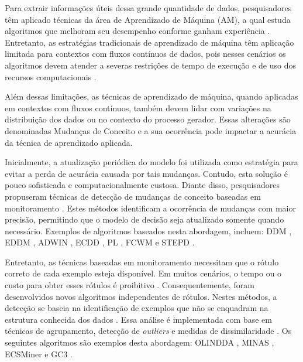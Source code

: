 \documentclass[qual, classic, a4paper]{ufbathesis}
\begin{document}
Para extrair informações úteis dessa grande quantidade de dados, 
pesquisadores têm aplicado técnicas da área de Aprendizado de Máquina (AM), 
a qual estuda algoritmos que melhoram seu desempenho conforme ganham experiência \cite{Mitchell:1997:ML:541177}.
%
Entretanto, as estratégias tradicionais de aprendizado de máquina têm aplicação limitada para contextos com fluxos contínuos de dados, 
pois nesses cenários os algoritmos devem atender a severas restrições de tempo de execução e de uso dos recursos computacionais \cite{bifet2009data}.

Além dessas limitações, 
as técnicas de aprendizado de máquina, 
quando aplicadas em contextos com fluxos contínuos, 
também devem lidar com variações na distribuição dos dados ou no contexto do processo gerador.
%
Essas alterações são denominadas Mudanças de Conceito \cite{Gama:2010:KDD:1855075} e 
a sua ocorrência pode impactar a acurácia da técnica de aprendizado aplicada.

Inicialmente, a atualização periódica do modelo foi utilizada como estratégia para evitar a perda de acurácia causada por tais mudanças.
%
Contudo, esta solução é pouco sofisticada e computacionalmente custosa.
% 
Diante disso, pesquisadores propuseram técnicas de detecção de mudanças de conceito baseadas em monitoramento \cite{Gama:2014:SCD:2597757.2523813}.
% 
Estes métodos identificam a ocorrência de mudanças com maior precisão, permitindo que o modelo de decisão seja atualizado somente quando necessário.
%
Exemplos de algoritmos baseados nesta abordagem, incluem: 
DDM \cite{GamaMCR04}, EDDM \cite{EDDM},  
ADWIN \cite{BifetG07}, ECDD \cite{Ross:2012:EWM:2076039.2076307}, 
PL \cite{Bach:PL:2008}, FCWM \cite{FCWM} e STEPD \cite{STEPD}.

Entretanto, as técnicas baseadas em monitoramento necessitam que o rótulo correto de cada exemplo esteja disponível.
%
Em muitos cenários, o tempo ou o custo para obter esses rótulos é proibitivo \cite{Aggarwal:2006:DSM:1196418}.
%
Consequentemente, foram desenvolvidos novos algoritmos independentes de rótulos.
Nestes métodos, a detecção se baseia na identificação de exemplos que não se enquadram na estrutura conhecida dos dados \cite{Spinosa:2007:OCA:1244002.1244107}.
% 
Essa análise é implementada com base em técnicas de agrupamento, detecção de \textit{outliers} e medidas de dissimilaridade \cite{Ryu:Kantardzic:2012}.
%
Os seguintes algoritmos são exemplos desta abordagem:
OLINDDA \cite{Spinosa:2007:OCA:1244002.1244107},
MINAS \cite{Faria:2013:NDA:2480362.2480515},
ECSMiner \cite{Masud:2011:CNC:1978259.1978529} e 
GC3 \cite{Sethi2016b:GC3}.
\end{document}
